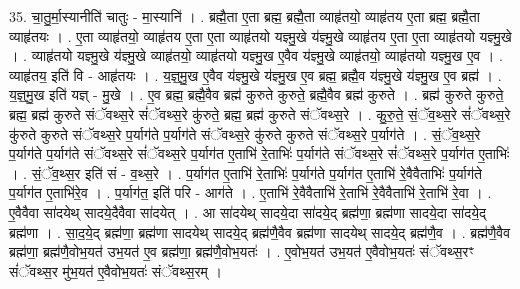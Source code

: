 \documentclass[17pt]{extarticle}
\begin{document}
35. चा॒तु॒र्मा॒स्यानीति॑ चातुः - मा॒स्यानि॑ । . ब्रह्मै॒ता ए॒ता ब्रह्म॒ ब्रह्मै॒ता व्याहृ॑तयो॒ व्याहृ॑तय ए॒ता ब्रह्म॒ ब्रह्मै॒ता व्याहृ॑तयः । . ए॒ता व्याहृ॑तयो॒ व्याहृ॑तय ए॒ता ए॒ता व्याहृ॑तयो यज्ञ्मु॒खे य॑ज्ञ्मु॒खे व्याहृ॑तय ए॒ता ए॒ता व्याहृ॑तयो यज्ञ्मु॒खे । . व्याहृ॑तयो यज्ञ्मु॒खे य॑ज्ञ्मु॒खे व्याहृ॑तयो॒ व्याहृ॑तयो यज्ञ्मु॒ख ए॒वैव य॑ज्ञ्मु॒खे व्याहृ॑तयो॒ व्याहृ॑तयो यज्ञ्मु॒ख ए॒व । . व्याहृ॑तय॒ इति॑ वि - आहृ॑तयः । . य॒ज्ञ्॒मु॒ख ए॒वैव य॑ज्ञ्मु॒खे य॑ज्ञ्मु॒ख ए॒व ब्रह्म॒ ब्रह्मै॒व य॑ज्ञ्मु॒खे य॑ज्ञ्मु॒ख ए॒व ब्रह्म॑ । . य॒ज्ञ्॒मु॒ख इति॑ यज्ञ् - मु॒खे । . ए॒व ब्रह्म॒ ब्रह्मै॒वैव ब्रह्म॑ कुरुते कुरुते॒ ब्रह्मै॒वैव ब्रह्म॑ कुरुते । . ब्रह्म॑ कुरुते कुरुते॒ ब्रह्म॒ ब्रह्म॑ कुरुते संॅवथ्स॒रे सं॑ॅवथ्स॒रे कु॑रुते॒ ब्रह्म॒ ब्रह्म॑ कुरुते संॅवथ्स॒रे । . कु॒रु॒ते॒ सं॒ॅव॒थ्स॒रे सं॑ॅवथ्स॒रे कु॑रुते कुरुते संॅवथ्स॒रे प॒र्याग॑ते प॒र्याग॑ते संॅवथ्स॒रे कु॑रुते कुरुते संॅवथ्स॒रे प॒र्याग॑ते । . सं॒ॅव॒थ्स॒रे प॒र्याग॑ते प॒र्याग॑ते संॅवथ्स॒रे सं॑ॅवथ्स॒रे प॒र्याग॑त ए॒ताभि॑ रे॒ताभिः॑ प॒र्याग॑ते संॅवथ्स॒रे सं॑ॅवथ्स॒रे प॒र्याग॑त ए॒ताभिः॑ । . सं॒ॅव॒थ्स॒र इति॑ सं - व॒थ्स॒रे । . प॒र्याग॑त ए॒ताभि॑ रे॒ताभिः॑ प॒र्याग॑ते प॒र्याग॑त ए॒ताभि॑ रे॒वैवैताभिः॑ प॒र्याग॑ते प॒र्याग॑त ए॒ताभि॑रे॒व । . प॒र्याग॑त॒ इति॑ परि - आग॑ते । . ए॒ताभि॑ रे॒वैवैताभि॑ रे॒ताभि॑ रे॒वैवैताभि॑ रे॒ताभि॑ रे॒वा । . ए॒वैवैवा सा॑दयेथ् सादये॒दैवैवा सा॑दयेत् । . आ सा॑दयेथ् सादये॒दा सा॑दये॒द् ब्रह्म॑णा॒ ब्रह्म॑णा सादये॒दा सा॑दये॒द् ब्रह्म॑णा । . सा॒द॒ये॒द् ब्रह्म॑णा॒ ब्रह्म॑णा सादयेथ् सादये॒द् ब्रह्म॑णै॒वैव ब्रह्म॑णा सादयेथ् सादये॒द् ब्रह्म॑णै॒व । . ब्रह्म॑णै॒वैव ब्रह्म॑णा॒ ब्रह्म॑णै॒वोभ॒यत॑ उभ॒यत॑ ए॒व ब्रह्म॑णा॒ ब्रह्म॑णै॒वोभ॒यतः॑ । . ए॒वोभ॒यत॑ उभ॒यत॑ ए॒वैवोभ॒यतः॑ संॅवथ्स॒रꣳ सं॑ॅवथ्स॒र मु॑भ॒यत॑ ए॒वैवोभ॒यतः॑ संॅवथ्स॒रम् । \newline
\end{document}
